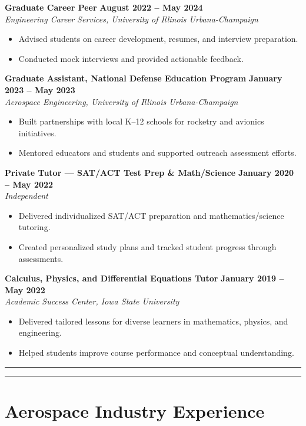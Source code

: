 \documentclass[10pt]{article}
\newcommand{\sectionline}{\noindent\rule{\linewidth}{0.4pt}}
\begin{document}
	\textbf{Graduate Career Peer} \hfill \textbf{August 2022 -- May 2024} \\
	\emph{Engineering Career Services, University of Illinois Urbana-Champaign}
	\begin{itemize}
		\item Advised students on career development, resumes, and interview preparation.
		\item Conducted mock interviews and provided actionable feedback.
	\end{itemize}
	
	\textbf{Graduate Assistant, National Defense Education Program} \hfill \textbf{January 2023 -- May 2023} \\
	\emph{Aerospace Engineering, University of Illinois Urbana-Champaign}
	\begin{itemize}
		\item Built partnerships with local K--12 schools for rocketry and avionics initiatives.
		\item Mentored educators and students and supported outreach assessment efforts.
	\end{itemize}
	
	\textbf{Private Tutor --- SAT/ACT Test Prep \& Math/Science} \hfill \textbf{January 2020 -- May 2022} \\
	\emph{Independent}
	\begin{itemize}
		\item Delivered individualized SAT/ACT preparation and mathematics/science tutoring.
		\item Created personalized study plans and tracked student progress through assessments.
	\end{itemize}
	
	\textbf{Calculus, Physics, and Differential Equations Tutor} \hfill \textbf{January 2019 -- May 2022} \\
	\emph{Academic Success Center, Iowa State University}
	\begin{itemize}
		\item Delivered tailored lessons for diverse learners in mathematics, physics, and engineering.
		\item Helped students improve course performance and conceptual understanding.
	\end{itemize}
	
	\sectionline
	
	\newpage
	
	\sectionline
	
	\section*{Aerospace Industry Experience}
	
\end{document}
